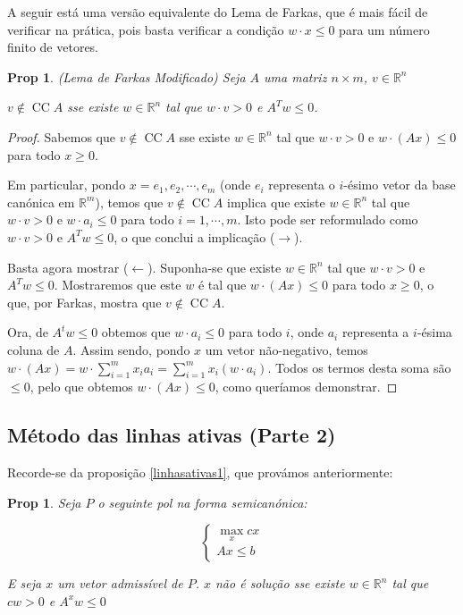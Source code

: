 \documentclass{article}
\DeclareMathOperator{\CC}{CC}
\newcommand{\R}{\mathbb{R}}
\newtheorem{prop}{Prop}
\newtheorem*{prop*}{Prop}
\theoremstyle{definition}
\begin{document}
	A seguir está uma versão equivalente do Lema de Farkas, que é mais fácil de verificar na prática, pois basta verificar a condição $w \cdot x \leq 0$ para um número finito de vetores.
	
	\begin{prop} (Lema de Farkas Modificado)
	Seja $A$ uma matriz $n \times m$, $v \in \R^n$
	
	$v \not \in \CC A$ sse existe $w \in \R^n$ tal que $w \cdot v > 0$ e $A^T w \leq 0$.
	\end{prop}
	
	\begin{proof}
	Sabemos que $v \not \in \CC A$ sse existe $w \in \R^n$ tal que $w \cdot v > 0$ e $w \cdot (Ax) \leq 0$ para todo $x \geq 0$.
	
	Em particular, pondo $x = e_1, e_2, \cdots, e_m$ (onde $e_i$ representa o $i$-ésimo vetor da base canónica em $\R^m$), temos que $v \not \in \CC A$ implica que existe $w \in \R^n$ tal que $w \cdot v > 0$ e $w \cdot a_i \leq 0$ para todo $i = 1, \cdots, m$. Isto pode ser reformulado como $w \cdot v > 0$ e $A^T w \leq 0$, o que conclui a implicação ($\rightarrow$).
	
	Basta agora mostrar ($\leftarrow$). Suponha-se que existe $w \in \R^n$ tal que $w \cdot v > 0$ e $A^T w \leq 0$. Mostraremos que este $w$ é tal que $w \cdot (Ax) \leq 0$ para todo $x \geq 0$, o que, por Farkas, mostra que $v \not \in \CC A$.
	
	Ora, de $A^t w \leq 0$ obtemos que $w \cdot a_i \leq 0$ para todo $i$, onde $a_i$ representa a $i$-ésima coluna de $A$. Assim sendo, pondo $x$ um vetor não-negativo, temos $w \cdot (Ax) = w \cdot \sum_{i=1}^m x_i a_i = \sum_{i=1}^m x_i (w \cdot a_i)$. Todos os termos desta soma são $\leq 0$, pelo que obtemos $w \cdot (Ax) \leq 0$, como queríamos demonstrar.
	\end{proof}
	
	\subsection{Método das linhas ativas (Parte 2)}
	
	Recorde-se da proposição \ref{linhasativas1}, que provámos anteriormente:
	
	\begin{prop*}
	Seja $P$ o seguinte pol na forma semicanónica:
	
	\[
	\begin{cases}
	\max\limits_x cx\\
	Ax \leq b
	\end{cases}
	\]
	
	E seja $x$ um vetor admissível de $P$. $x$ não é solução sse existe $w \in \R^n$ tal que $cw > 0$ e $A^x w \leq 0$
	\end{prop*}
	
\end{document}
